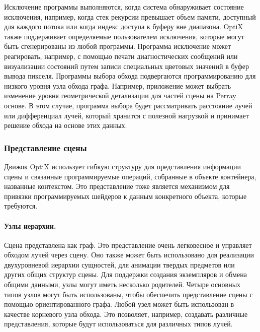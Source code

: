   Исключение программы выполняются, когда система обнаруживает состояние исключения, например, когда стек рекурсии превышает объем памяти, доступный для каждого потока или когда индекс доступа к буферу вне диапазона.
  OptiX также поддерживает определяемые пользователем исключения, которые могут быть сгенерированы из любой программы.
  Программа исключение может реагировать, например, с помощью печати диагностических сообщений или визуализации состояний путем записи специальных цветовых значений в буфер вывода пикселя.
  Программы выбора обхода подвергаются программированию для низкого уровня узла обхода графа.
  Например, приложение может выбрать изменение уровня геометрической детализации для частей сцены на Perray основе.
  В этом случае, программа выбора будет рассматривать расстояние лучей или дифференциал лучей, который хранится с полезной нагрузкой и принимает решение обхода на основе этих данных.
  
 \subsubsection{Представление сцены}
 
 Движок OptiX использует гибкую структуру для представления информации сцены и связанные программируемые операций, собранные в объекте контейнера, названные контекстом.
 Это представление тоже является механизмом для привязки программируемых шейдеров к данным конкретного объекта, которые требуются.

\paragraph{Узлы иерархии.}

Сцена представлена как граф. Это представление очень легковесное и управляет обходом лучей через сцену. 
 Оно также может быть использовано для реализации двухуровневой иерархии сущностей, для анимации твердых предметов или других общих структур сцены.
 Для поддержки создания экземпляров и обмена общими данными, узлы могут иметь несколько родителей.
 Четыре основных типов узлов могут быть использованы, чтобы обеспечить представление сцены с помощью ориентированного графа.
 Любой узел может быть использован в качестве корневого узла обхода.
 Это позволяет, например, создавать различные представления, которые будут использоваться для различных типов лучей.
 
